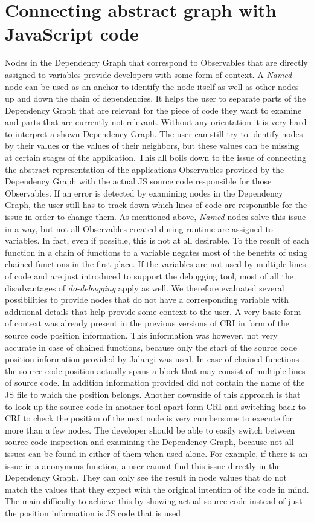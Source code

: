\section{Connecting abstract graph with JavaScript code}
Nodes in the Dependency Graph that correspond to Observables that are directly assigned to variables provide developers with some form of context. A \emph{Named} node can be used as an anchor to identify the node itself as well as other nodes up and down the chain of dependencies. It helps the user to separate parts of the Dependency Graph that are relevant for the piece of code they want to examine and parts that are currently not relevant. Without any orientation it is very hard to interpret a shown Dependency Graph. The user can still try to identify nodes by their values or the values of their neighbors, but these values can be missing at certain stages of the application. This all boils down to the issue of connecting the abstract representation of the applications Observables provided by the Dependency Graph with the actual JS source code responsible for those Observables. If an error is detected by examining nodes in the Dependency Graph, the user still has to track down which lines of code are responsible for the issue in order to change them. As mentioned above, \emph{Named} nodes solve this issue in a way, but not all Observables created during runtime are assigned to variables. In fact, even if possible, this is not at all desirable. To the result of each function in a chain of functions to a variable negates most of the benefits of using chained functions in the first place. If the variables are not used by multiple lines of code and are just introduced to support the debugging tool, most of all the disadvantages of \emph{do-debugging} apply as well. We therefore evaluated several possibilities to provide nodes that do not have a corresponding variable with additional details that help provide some context to the user. A very basic form of context was already present in the previous versions of CRI in form of the source code position information. This information was however, not very accurate in case of chained functions, because only the start of the source code position information provided by Jalangi was used. In case of chained functions the source code position actually spans a block that may consist of multiple lines of source code. In addition information provided did not contain the name of the JS file to which the position belongs. Another downside of this approach is that to look up the source code in another tool apart form CRI and switching back to CRI to check the position of the next node is very cumbersome to execute for more than a few nodes. The developer should be able to easily switch between source code inspection and examining the Dependency Graph, because not all issues can be found in either of them when used alone. For example, if there is an issue in a anonymous function, a user cannot find this issue directly in the Dependency Graph. They can only see the result in node values that do not match the values that they expect with the original intention of the code in mind. The main difficulty to achieve this by showing actual source code instead of just the position information is JS code that is used 